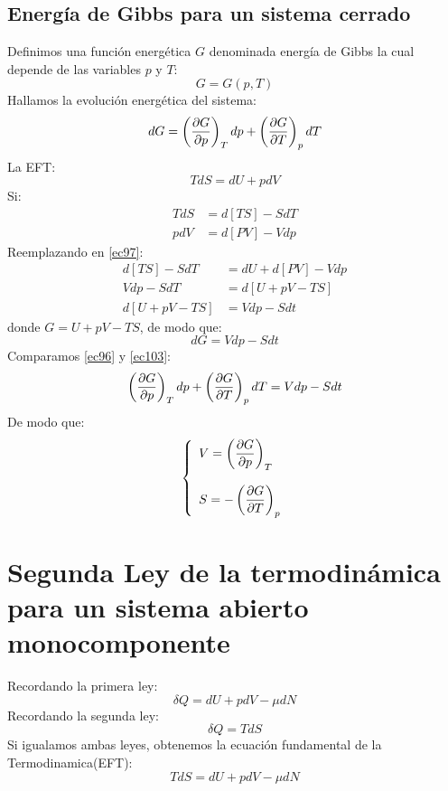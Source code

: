\documentclass[../main]{subfiles}
\begin{document}
\section{Energía de Gibbs para un sistema cerrado}
Definimos una función energética $G$ denominada energía de Gibbs la cual depende de las variables $p$ y $T$:
\begin{equation}
    G=G(p,T)
\end{equation}
Hallamos la evolución energética del sistema:
\begin{equation}
    dG=\left( \pdv{G}{p}\right)_T dp+\left( \pdv{G}{T}\right)_p dT
    \label{ec96}
\end{equation}
La EFT:
\begin{equation}
    TdS=dU+pdV
    \label{ec97}
\end{equation}
Si:
\begin{align}
    TdS&=d[TS]-SdT \\
    pdV&=d[PV]-Vdp
\end{align}
Reemplazando en \eqref{ec97}:
\begin{align}
    d[TS]-SdT&=dU+d[PV]-Vdp \\
    Vdp-SdT&=d[U+pV-TS] \\
    d[U+pV-TS]&= Vdp-Sdt
\end{align}
donde $G=U+pV-TS$, de modo que:
\begin{equation}
    dG=Vdp-Sdt
    \label{ec103}
\end{equation}
Comparamos \eqref{ec96} y \eqref{ec103}:
\begin{equation}
    \left( \pdv{G}{p}\right)_T dp+\left( \pdv{G}{T}\right)_p dT=Vdp-Sdt
\end{equation}
De modo que:
\begin{equation}
    \left\{ 
    \begin{array}{l}
         V=\displaystyle \left( \pdv{G}{p} \right)_{T} \\ \\
         S=-\displaystyle \left(\pdv{G}{T}\right)_{p} 
    \end{array} 
    \right. 
\end{equation}

\chapter{Segunda Ley de la termodinámica para un sistema abierto monocomponente}
Recordando la primera ley:
\begin{equation}
    \delta Q = dU+pdV-\mu dN
\end{equation}
Recordando la segunda ley:
\begin{equation}
    \delta Q = TdS
\end{equation}
Si igualamos ambas leyes, obtenemos la ecuación fundamental de la Termodinamica(EFT):
\begin{equation}
    TdS=dU+pdV-\mu dN
\end{equation}
\end{document}
